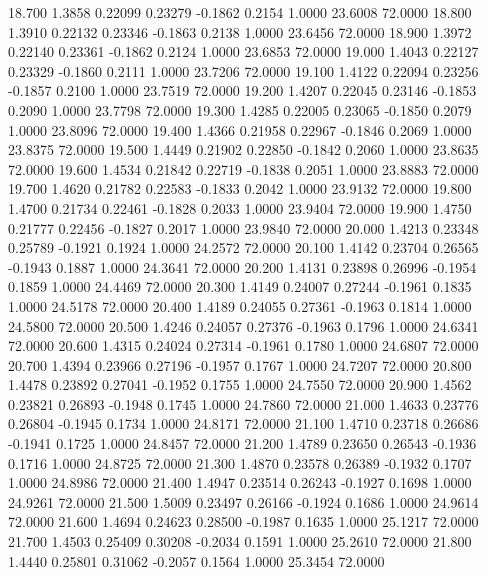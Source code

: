   18.700   1.3858   0.22099   0.23279  -0.1862   0.2154   1.0000  23.6008  72.0000
  18.800   1.3910   0.22132   0.23346  -0.1863   0.2138   1.0000  23.6456  72.0000
  18.900   1.3972   0.22140   0.23361  -0.1862   0.2124   1.0000  23.6853  72.0000
  19.000   1.4043   0.22127   0.23329  -0.1860   0.2111   1.0000  23.7206  72.0000
  19.100   1.4122   0.22094   0.23256  -0.1857   0.2100   1.0000  23.7519  72.0000
  19.200   1.4207   0.22045   0.23146  -0.1853   0.2090   1.0000  23.7798  72.0000
  19.300   1.4285   0.22005   0.23065  -0.1850   0.2079   1.0000  23.8096  72.0000
  19.400   1.4366   0.21958   0.22967  -0.1846   0.2069   1.0000  23.8375  72.0000
  19.500   1.4449   0.21902   0.22850  -0.1842   0.2060   1.0000  23.8635  72.0000
  19.600   1.4534   0.21842   0.22719  -0.1838   0.2051   1.0000  23.8883  72.0000
  19.700   1.4620   0.21782   0.22583  -0.1833   0.2042   1.0000  23.9132  72.0000
  19.800   1.4700   0.21734   0.22461  -0.1828   0.2033   1.0000  23.9404  72.0000
  19.900   1.4750   0.21777   0.22456  -0.1827   0.2017   1.0000  23.9840  72.0000
  20.000   1.4213   0.23348   0.25789  -0.1921   0.1924   1.0000  24.2572  72.0000
  20.100   1.4142   0.23704   0.26565  -0.1943   0.1887   1.0000  24.3641  72.0000
  20.200   1.4131   0.23898   0.26996  -0.1954   0.1859   1.0000  24.4469  72.0000
  20.300   1.4149   0.24007   0.27244  -0.1961   0.1835   1.0000  24.5178  72.0000
  20.400   1.4189   0.24055   0.27361  -0.1963   0.1814   1.0000  24.5800  72.0000
  20.500   1.4246   0.24057   0.27376  -0.1963   0.1796   1.0000  24.6341  72.0000
  20.600   1.4315   0.24024   0.27314  -0.1961   0.1780   1.0000  24.6807  72.0000
  20.700   1.4394   0.23966   0.27196  -0.1957   0.1767   1.0000  24.7207  72.0000
  20.800   1.4478   0.23892   0.27041  -0.1952   0.1755   1.0000  24.7550  72.0000
  20.900   1.4562   0.23821   0.26893  -0.1948   0.1745   1.0000  24.7860  72.0000
  21.000   1.4633   0.23776   0.26804  -0.1945   0.1734   1.0000  24.8171  72.0000
  21.100   1.4710   0.23718   0.26686  -0.1941   0.1725   1.0000  24.8457  72.0000
  21.200   1.4789   0.23650   0.26543  -0.1936   0.1716   1.0000  24.8725  72.0000
  21.300   1.4870   0.23578   0.26389  -0.1932   0.1707   1.0000  24.8986  72.0000
  21.400   1.4947   0.23514   0.26243  -0.1927   0.1698   1.0000  24.9261  72.0000
  21.500   1.5009   0.23497   0.26166  -0.1924   0.1686   1.0000  24.9614  72.0000
  21.600   1.4694   0.24623   0.28500  -0.1987   0.1635   1.0000  25.1217  72.0000
  21.700   1.4503   0.25409   0.30208  -0.2034   0.1591   1.0000  25.2610  72.0000
  21.800   1.4440   0.25801   0.31062  -0.2057   0.1564   1.0000  25.3454  72.0000
